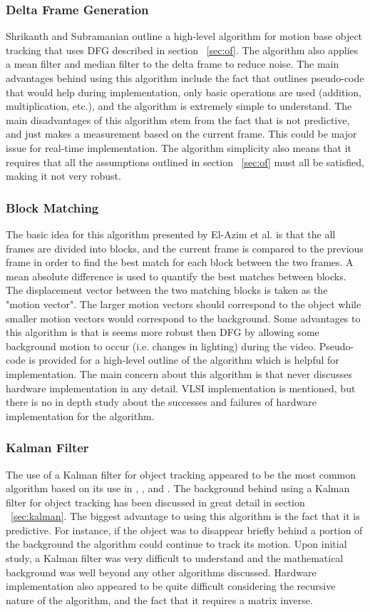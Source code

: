 \documentclass[12pt]{article} %
\begin{document}
\subsubsection{Delta Frame Generation}
Shrikanth and Subramanian \cite{8} outline a high-level algorithm for motion base object tracking that uses DFG described in section ~\ref{sec:of}. The algorithm also applies a mean filter and median filter to the delta frame to reduce noise. The main advantages behind using this algorithm include the fact that \cite{8} outlines pseudo-code that would help during implementation, only basic operations are used (addition, multiplication, etc.), and the algorithm is extremely simple to understand. The main disadvantages of this algorithm stem from the fact that is not predictive, and just makes a measurement based on the current frame. This could be major issue for real-time implementation. The algorithm simplicity also means that it requires that all the assumptions outlined in section ~\ref{sec:of} must all be satisfied, making it not very robust.
\subsubsection{Block Matching}
The basic idea for this algorithm presented by El-Azim et al. \cite{5} is that the all frames are divided into blocks, and the current frame is compared to the previous frame in order to find the best match for each block between the two frames. A mean absolute difference is used to quantify the best matches between blocks. The displacement vector between the two matching blocks is taken as the "motion vector". The larger motion vectors should correspond to the object while smaller motion vectors would correspond to the background. Some advantages to this algorithm is that is seems more robust then DFG by allowing some background motion to occur (i.e. changes in lighting) during the video. Pseudo-code is provided for a high-level outline of the algorithm which is helpful for implementation. The main concern about this algorithm is that \cite{5} never discusses hardware implementation in any detail. VLSI implementation is mentioned, but there is no in depth study about the successes and failures of hardware implementation for the algorithm.
\subsubsection{Kalman Filter}
The use of a Kalman filter for object tracking appeared to be the most common algorithm based on its use in \cite{4}, \cite{7}, and \cite{9}. The background behind using a Kalman filter for object tracking has been discussed in great detail in section ~\ref{sec:kalman}. The biggest advantage to using this algorithm is the fact that it is predictive. For instance, if the object was to disappear briefly behind a portion of the background the algorithm could continue to track its motion. Upon initial study, a Kalman filter was very difficult to understand and the mathematical background was well beyond any other algorithms discussed. Hardware implementation also appeared to be quite difficult considering the recursive nature of the algorithm, and the fact that it requires a matrix inverse.
\end{document}
